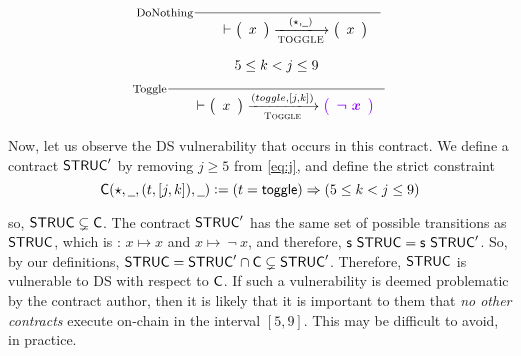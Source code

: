 \begin{equation}
  \inference[DoNothing]
  { \\
  }
  {
  \begin{array}{l}
    \\
  \end{array}
    \vdash
    \left(
    \begin{array}{r}
      x
    \end{array}
    \right)
    \trans{TOGGLE}{(\emptytype, \wcard)}
    \left(
    \begin{array}{r}
      x
    \end{array}
    \right) \\
  }
\end{equation}
\begin{equation}
  \label{eq:j}
  \inference[Toggle]
  {~\\
  5 \leq k < j \leq 9 \\~\\
  }
  {
  \begin{array}{l}
    \\
  \end{array}
    \vdash
    \left(
    \begin{array}{r}
      x
    \end{array}
    \right)
    \trans{Toggle}{(toggle, [j, k])}
    \varUpdate{\left(
    \begin{array}{r}
      \neg~x
    \end{array}
    \right) } \\
  }
\end{equation}

Now, let us observe the DS vulnerability that occurs in this contract.
We define a contract $\mathsf{STRUC}'$ by removing $j \geq 5$ from \ref{eq:j},
and define the strict constraint
\[ \fun{C} (\emptytype, \wcard, (t, [j,k]), \wcard) \leteq (t = \toggle) \Rightarrow (5 \leq k < j \leq 9) \]

so, $\mathsf{STRUC} \subsetneq \mathsf{C}$. The contract $\mathsf{STRUC}'$ has the same set of possible
transitions as $\mathsf{STRUC}$, which is : $x \mapsto x$
and $x \mapsto ~\neg~x$, and therefore, $\mathsf{s}~\mathsf{STRUC} = \mathsf{s}~\mathsf{STRUC}'$.
So, by our definitions, $\mathsf{STRUC} = \mathsf{STRUC}' \cap \mathsf{C} \subsetneq \mathsf{STRUC}'$.
Therefore, $\mathsf{STRUC}$ is vulnerable to DS with respect to $\mathsf{C}$. If such a
vulnerability is deemed problematic by the contract author, then it is likely
that it is important to them that \emph{no other contracts} execute on-chain in the interval
$[5, 9]$. This may be difficult to avoid, in practice.

